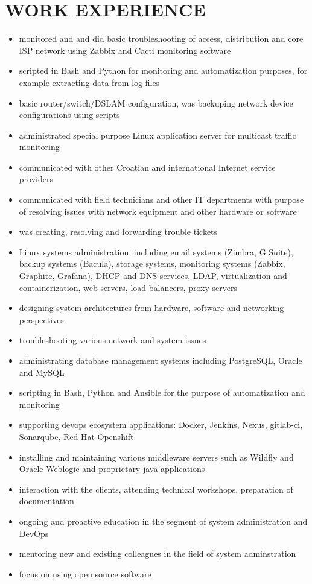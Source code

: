 \documentclass{cv}
\begin{document}
\section{WORK EXPERIENCE}
\begin{itemize}
    \setlength\itemsep{0.1cm}
    \item monitored and and did basic troubleshooting of access, distribution and core ISP network using Zabbix and
Cacti monitoring software
    \item scripted in Bash and Python for monitoring and automatization purposes, for example extracting data from log
files
    \item basic router/switch/DSLAM configuration, was backuping network device configurations using scripts
    \item administrated special purpose Linux application server for multicast traffic monitoring
    \item communicated with other Croatian and international Internet service providers
    \item communicated with field technicians and other IT departments with purpose of resolving issues with
network equipment and other hardware or software
    \item was creating, resolving and forwarding trouble tickets
\end{itemize}
\begin{itemize}
    \setlength\itemsep{0.1cm}
    \item Linux systems administration, including email systems (Zimbra, G Suite), backup systems (Bacula), storage systems, monitoring systems (Zabbix, Graphite, Grafana), DHCP and DNS services, LDAP, virtualization and containerization, web servers, load balancers, proxy servers
    \item designing system architectures from hardware, software and networking perspectives
    \item troubleshooting various network and system issues 
    \item administrating database management systems including PostgreSQL, Oracle and MySQL
    \item scripting in Bash, Python and Ansible for the purpose of automatization and monitoring
    \item supporting devops ecosystem applications: Docker, Jenkins, Nexus, gitlab-ci, Sonarqube, Red Hat Openshift
    \item installing and maintaining various middleware servers such as Wildfly and Oracle Weblogic and proprietary java applications
    \item interaction with the clients, attending technical workshops, preparation of documentation
    \item ongoing and proactive education in the segment of system administration and DevOps
    \item mentoring new and existing colleagues in the field of system adminstration
    \item focus on using open source software
\end{itemize}
\end{document}
